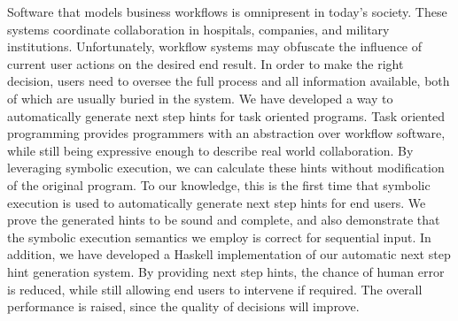 
Software that models business workflows is omnipresent in today's society.
These systems coordinate collaboration in hospitals, companies, and military institutions.
Unfortunately, workflow systems may obfuscate the influence of current user actions on the desired end result.
In order to make the right decision, users need to oversee the full process and all information available,
both of which are usually buried in the system.
We have developed a way to automatically generate next step hints for task oriented programs.
Task oriented programming provides programmers with an abstraction over workflow software, while still being expressive enough to describe real world collaboration.
By leveraging symbolic execution, we can calculate these hints without modification of the original program.
To our knowledge, this is the first time that symbolic execution is used to automatically generate next step hints for end users.
We prove the generated hints to be sound and complete,
and also demonstrate that the symbolic execution semantics we employ is correct for sequential input.
In addition, we have developed a Haskell implementation of our automatic next step hint generation system.
By providing next step hints, the chance of human error is reduced, while still allowing end users to intervene if required.
The overall performance is raised, since the quality of decisions will improve.


